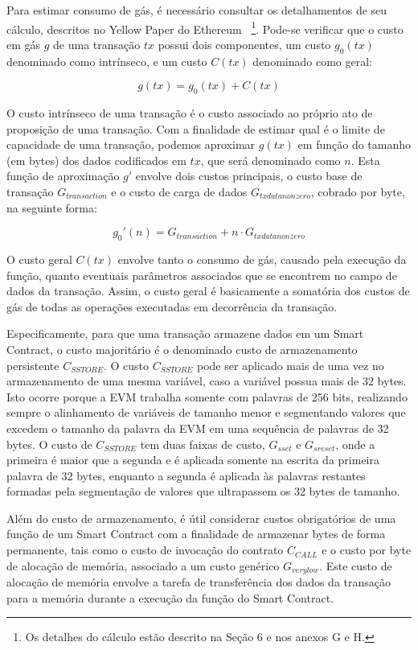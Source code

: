 \documentclass[a4paper,11pt]{article}
\begin{document}
Para estimar consumo de gás, é necessário consultar os detalhamentos de seu cálculo, descritos no Yellow Paper do Ethereum \cite{Wood2017}~\footnote{Os detalhes do cálculo estão descrito na Seção 6 e nos anexos G e H.}.
Pode-se verificar que o custo em gás $g$ de uma transação $tx$ possui dois componentes, um custo $g_{0}(tx)$ denominado como intrínseco, e um custo $C(tx)$ denominado como geral:

\begin{equation}
    g(tx) = g_{0}(tx) + C(tx)
\end{equation}

O custo intrínseco de uma transação é o custo associado ao próprio ato de proposição de uma transação.
Com a finalidade de estimar qual é o limite de capacidade de uma transação, podemos aproximar $g(tx)$ em função do tamanho (em bytes) dos dados codificados em $tx$, que será denominado como $n$.
Esta função de aproximação $g'$ envolve dois custos principais, o custo base de transação $G_{transaction}$ e o custo de carga de dados $G_{txdatanonzero}$, cobrado por byte, na seguinte forma:

\begin{equation}
    g_{0}'(n) = G_{transaction} + n \cdot G_{txdatanonzero}
\end{equation}

O custo geral $C(tx)$ envolve tanto o consumo de gás, causado pela execução da função, quanto eventuais parâmetros associados que se encontrem no campo de dados da transação.
Assim, o custo geral é basicamente a somatória dos custos de gás de todas as operações executadas em decorrência da transação.

Especificamente, para que uma transação armazene dados em um Smart Contract, o custo majoritário é o denominado custo de armazenamento persistente $C_{SSTORE}$.
O custo $C_{SSTORE}$ pode ser aplicado mais de uma vez no armazenamento de uma mesma variável, caso a variável possua mais de 32 bytes.
Isto ocorre porque a EVM trabalha somente com palavras de 256 bits, realizando sempre o alinhamento de variáveis de tamanho menor e segmentando valores que excedem o tamanho da palavra da EVM em uma sequência de palavras de 32 bytes.
O custo de $C_{SSTORE}$ tem duas faixas de custo, $G_{sset}$ e $G_{sreset}$, onde a primeira é maior que a segunda e é aplicada somente na escrita da primeira palavra de 32 bytes, enquanto a segunda é aplicada às palavras restantes formadas pela segmentação de valores que ultrapassem os 32 bytes de tamanho.

Além do custo de armazenamento, é útil considerar custos obrigatórios de uma função de um Smart Contract com a finalidade de armazenar bytes de forma permanente, tais como o custo de invocação do contrato $C_{CALL}$ e o custo por byte de alocação de memória, associado a um custo genérico $G_{verylow}$.
Este custo de alocação de memória envolve a tarefa de transferência dos dados da transação para a memória durante a execução da função do Smart Contract.
\end{document}
